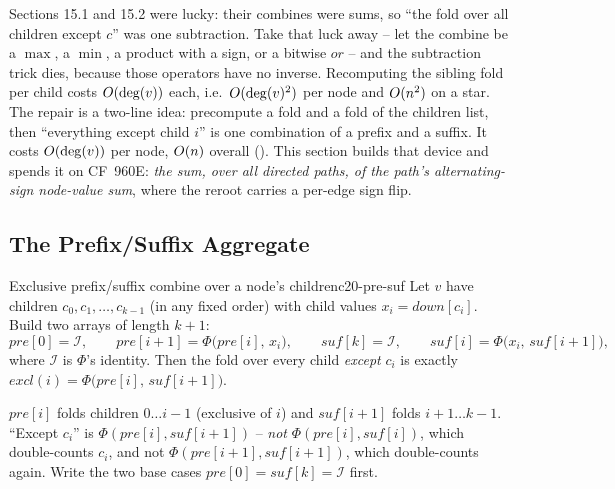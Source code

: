 \begin{topicintro}
Sections 15.1 and 15.2 were lucky: their combines were sums, so ``the fold over
all children except $c$'' was one subtraction. Take that luck away -- let the
combine be a $\max$, a $\min$, a product with a sign, or a bitwise $\mathit{or}$
-- and the subtraction trick dies, because those operators have no inverse.
Recomputing the sibling fold per child costs $O(\deg(v))$ each, i.e.\
$O(\deg(v)^2)$ per node and $O(n^2)$ on a star. The repair is a two-line
idea: precompute a \term{prefix} fold and a \term{suffix} fold of the children
list, then ``everything except child $i$'' is one combination of a prefix and a
suffix. It costs $O(\deg(v))$ per node, $O(n)$ overall
(). This section builds that device and spends it on
CF~960E: \emph{the sum, over all directed paths, of the path's alternating-sign
node-value sum}, where the reroot carries a per-edge sign flip.
\end{topicintro}

\subsection{The Prefix/Suffix Aggregate}

\begin{definition}{Exclusive prefix/suffix combine over a node's children}{c20-pre-suf}
Let $v$ have children $c_0, c_1, \dots, c_{k-1}$ (in any fixed order) with child
values $x_i = \mathit{down}[c_i]$. Build two arrays of length $k{+}1$:
\[
  \mathit{pre}[0] = \mathcal{I}, \qquad \mathit{pre}[i{+}1] = \Phi\bigl(\mathit{pre}[i],\, x_i\bigr),
  \qquad \mathit{suf}[k] = \mathcal{I}, \qquad \mathit{suf}[i] = \Phi\bigl(x_i,\, \mathit{suf}[i{+}1]\bigr),
\]
where $\mathcal{I}$ is $\Phi$'s identity. Then the fold over every child
\emph{except} $c_i$ is exactly
$\mathit{excl}(i) = \Phi\bigl(\mathit{pre}[i],\, \mathit{suf}[i{+}1]\bigr)$.
\end{definition}

\begin{warningbox}
$\mathit{pre}[i]$ folds children $0 \dots i{-}1$ (exclusive of $i$) and
$\mathit{suf}[i{+}1]$ folds $i{+}1 \dots k{-}1$. ``Except $c_i$'' is
$\Phi(\mathit{pre}[i], \mathit{suf}[i{+}1])$ -- \emph{not}
$\Phi(\mathit{pre}[i], \mathit{suf}[i])$, which double-counts $c_i$, and not
$\Phi(\mathit{pre}[i{+}1], \mathit{suf}[i{+}1])$, which double-counts again.
Write the two base cases $\mathit{pre}[0]=\mathit{suf}[k]=\mathcal{I}$ first.
\end{warningbox}

